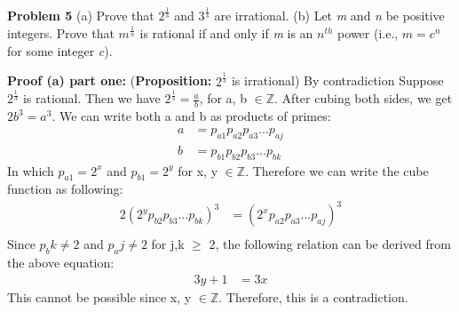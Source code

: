 \documentclass[12pt,letterpaper]{hmcpset}
\begin{document}
\begin{problem}
\textbf{Problem 5} (a) Prove that $2^{\frac{1}{3}}$ and $3^{\frac{1}{3}}$ are irrational.
(b) Let \emph{m} and \emph{n} be positive integers. Prove that $m^{\frac{1}{n}}$ is rational if and only
if \emph{m} is an $n^{th}$ power (i.e., $m = c^{n}$ for some integer \emph{c}).
\end{problem}

\begin{solution}
\textbf{Proof (a) part one:} (\textbf{Proposition:} $2^{\frac{1}{3}}$ is irrational) By contradiction
\newline Suppose $2^{\frac{1}{3}}$ is rational. Then we have $2^{\frac{1}{3}}=\frac{a}{b}$, for a, b $\in \mathbb{Z}$. After cubing both sides, we get $2b^{3}=a^{3}$. We can write both a and b as products of primes:
\begin{align*}
a	&= p_{a1}p_{a2}p_{a3}...p_{aj}	\\
b	&= p_{b1}p_{b2}p_{b3}...p_{bk}
\end{align*}
In which $p_{a1}=2^{x}$ and $p_{b1}=2^{y}$ for x, y $\in \mathbb{Z}$. Therefore we can write the cube function as following:
\begin{align*}
2(2^{y}p_{b2}p_{b3}...p_{bk})^{3}	&= (2^{x}p_{a2}p_{a3}...p_{aj})^{3}	\\
\end{align*}
Since $p_bk \neq 2$ and $p_aj \neq 2$ for j,k $\ge$ 2, the following relation can be derived from the above equation:
\begin{align*}
3y + 1	&=	3x
\end{align*}
This cannot be possible since x, y $\in\mathbb{Z}$. Therefore, this is a contradiction.
\end{solution}
\end{document}
